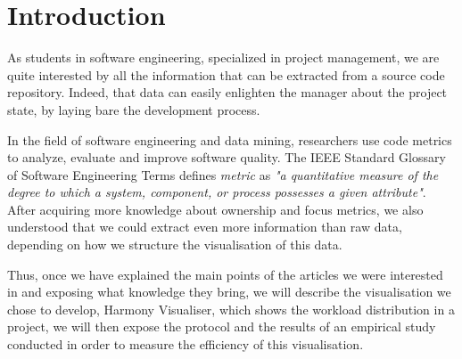 \section{Introduction}

As students in software engineering, specialized in project management, we are quite interested by all the information that can be extracted from a source code repository. Indeed, that data can easily enlighten the manager about the project state, by laying bare the development process. 

In the field of software engineering and data mining, researchers use code metrics to analyze, evaluate and improve software quality. The IEEE Standard Glossary of Software Engineering Terms defines \emph{metric} as \emph{"a quantitative measure of the degree to which a system, component, or process possesses a given attribute"}\cite{RSPressman}.\\
After acquiring more knowledge about ownership\cite{Girba2005,Girba2007} and focus metrics\cite{Posnett}, we also understood that we could extract even more information than raw data, depending on how we structure the visualisation of this data.

Thus, once we have explained the main points of the articles we were interested in and exposing what knowledge they bring, we will describe the visualisation we chose to develop, Harmony Visualiser, which shows the workload distribution in a project, we will then expose the protocol and the results of an empirical study conducted in order to measure the efficiency of this visualisation.